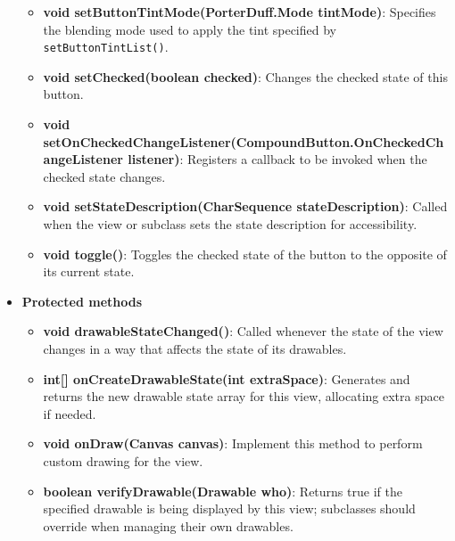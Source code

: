 \documentclass{report}
\begin{document}
\begin{itemize}
\begin{itemize}
                \item \textbf{void setButtonTintMode(PorterDuff.Mode tintMode)}: Specifies the blending mode used to apply the tint specified by \texttt{setButtonTintList()}.
                \item \textbf{void setChecked(boolean checked)}: Changes the checked state of this button.
                \item \textbf{void setOnCheckedChangeListener(CompoundButton.OnCheckedChangeListener listener)}: Registers a callback to be invoked when the checked state changes.
                \item \textbf{void setStateDescription(CharSequence stateDescription)}: Called when the view or subclass sets the state description for accessibility.
                \item \textbf{void toggle()}: Toggles the checked state of the button to the opposite of its current state.
            \end{itemize}
        \item \textbf{Protected methods}
            \begin{itemize}
                \item \textbf{void drawableStateChanged()}: Called whenever the state of the view changes in a way that affects the state of its drawables.
                \item \textbf{int[] onCreateDrawableState(int extraSpace)}: Generates and returns the new drawable state array for this view, allocating extra space if needed.
                \item \textbf{void onDraw(Canvas canvas)}: Implement this method to perform custom drawing for the view.
                \item \textbf{boolean verifyDrawable(Drawable who)}: Returns true if the specified drawable is being displayed by this view; subclasses should override when managing their own drawables.
            \end{itemize}

    \end{itemize}

    \pagebreak 
\end{document}
